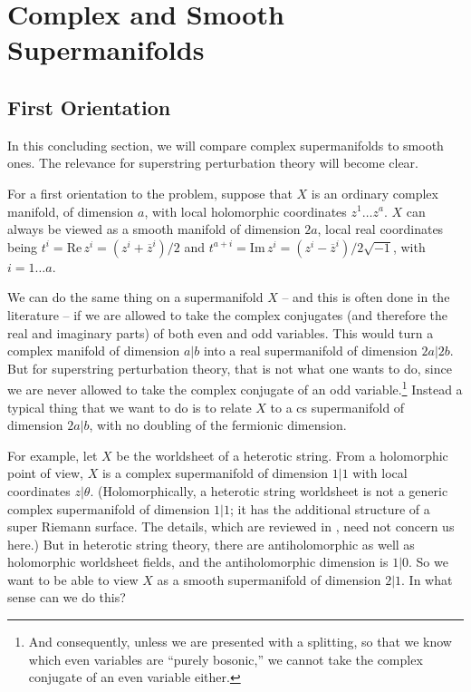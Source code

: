 \documentclass[11pt,a4paper]{article}
\def\bar{\overline}
\begin{document}
\section{Complex and Smooth Supermanifolds}\label{bicomplex}

\subsection{First Orientation}\label{orient}

In this concluding section, we will compare complex supermanifolds to smooth ones.  The relevance for superstring perturbation theory will become clear.

For a first orientation to the problem, suppose that $X$ is an ordinary 
complex manifold, of dimension $a$, with local holomorphic coordinates
$z^1\dots z^a$.   $X$ can always be viewed
as a smooth manifold of dimension $2a$, local real coordinates being 
$t^i=\mathrm{Re}\,z^i=(z^i+\bar z^i)/2$ and $t^{a+i}=\mathrm{Im}\,z^i=(z^i-\bar z^i)/2\sqrt{-1}$, with $i=1\dots a$.

We can do the same thing on a supermanifold $X$ -- and this is often done in the literature --
 if we are allowed to take the complex conjugates (and therefore the real and imaginary
 parts) of both even and odd variables.  This would
turn a complex manifold of dimension $a|b$ into a real supermanifold of dimension $2a|2b$.
But for superstring perturbation theory,
that is not what one wants to do, since we are never allowed to take the complex 
conjugate of an odd variable.\footnote{And consequently, unless we are presented with a splitting, 
so that we know which even variables are ``purely bosonic,'' 
we cannot take
the complex conjugate of an even variable either.}  Instead a typical
thing that we want to do is to relate $X$ to a cs supermanifold of dimension $2a|b$, 
with no doubling of the fermionic dimension.  

For  example, let $X$ be the worldsheet of a heterotic string.  From a holomorphic point of view,  
$X$ is a complex supermanifold of dimension $1|1$ with
local coordinates $z|\theta$.  (Holomorphically, a heterotic string worldsheet is
not a generic complex supermanifold of dimension $1|1$; it has the additional
structure of a super Riemann surface. The details,
which are reviewed in  \cite{supersurf},  need not concern us here.)  
But in heterotic string theory, there are antiholomorphic as well as holomorphic
worldsheet fields, and the antiholomorphic dimension is $1|0$.  
So we want to be able to view $X$ as a smooth supermanifold of dimension $2|1$.  
In what sense can we do this?
\end{document}
